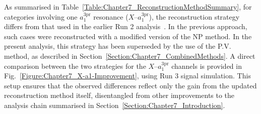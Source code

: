 As summarised in Table~\ref{Table:Chapter7_ReconstructionMethodSummary}, for categories involving one $a_1^{3\mathrm{pr}}$ resonance (\ie $X$–$a_1^{3\mathrm{pr}}$), the reconstruction strategy differs from that used in the earlier Run 2 analysis~\cite{HiggsCP_CMS_2021}. In the previous approach, such cases were reconstructed with a modified version of the \ac{NP} method. In the present analysis, this strategy has been superseded by the use of the \ac{P.V.} method, as described in Section~\ref{Section:Chapter7_CombinedMethods}. A direct comparison between the two strategies for the $X$–$a_1^{3\mathrm{pr}}$ channels is provided in Fig.~\ref{Figure:Chapter7_X-a1-Improvement}, using Run 3 signal simulation. This setup ensures that the observed differences reflect only the gain from the updated reconstruction method itself, disentangled from other improvements to the analysis chain summarised in Section~\ref{Section:Chapter7_Introduction}.

